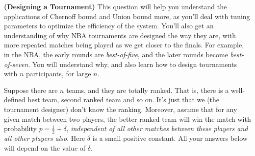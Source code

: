 \documentclass[solution,addpoints,12pt]{exam}
\begin{document}
\begin{questions}


\question[15] \textbf{(Designing a Tournament)}  This question will help you understand the applications of Chernoff bound and Union bound more, as you'll deal with tuning parameters to optimize the efficiency of the system. You'll also get an understanding of why NBA tournaments are designed the way they are, with more repeated matches being played as we get closer to the finals. For example, in the NBA, the early rounds are \emph{best-of-five}, and the later rounds become \emph{best-of-seven}. You will understand why, and also learn how to design tournaments with $n$ participants, for large $n$.

Suppose there are $n$ teams, and they are totally ranked. That is, there is a well-defined best team, second ranked team and so on. It's just that we (the tournament designer) don't know the ranking. Moreover, assume that for any given match between two players, the better ranked team will win the match with probability $p = \frac12 + \delta$, \emph{independent of all other matches between these players and all other players also}. Here $\delta$ is a small positive constant. All your answers below will depend on the value of $\delta$.

\end{questions}
\end{document}
